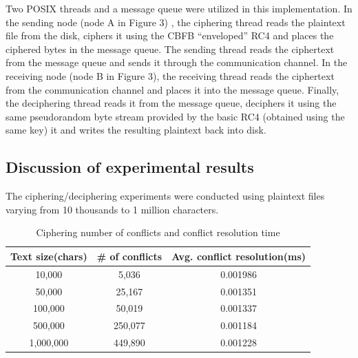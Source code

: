 \documentclass[conference]{IEEEtran}
\begin{document}
Two POSIX threads and a message queue were utilized in this implementation. In the sending node (node A in Figure 3) , the ciphering thread reads the plaintext file from the disk, ciphers it using the CBFB “enveloped” RC4 and places the ciphered bytes in the message queue. The sending thread reads the ciphertext from the message queue and sends it through the communication channel. In the receiving node (node B in Figure 3), the receiving thread reads the ciphertext from the communication channel and places it into the message queue. Finally, the deciphering thread reads it from the message queue, deciphers it using the same pseudorandom byte stream provided by the basic RC4 (obtained using the same key) it and writes the resulting plaintext back into disk.

\subsection{Discussion of experimental results}

The ciphering/deciphering experiments were conducted using plaintext files varying from 10 thousands to 1 million characters. 

\begin{table}[!t]
\centering
\begin{tabular}{|c|c|c|}
\hline
Text size(chars) & \# of conflicts & Avg. conflict resolution(ms) \\ \hline
10,000  & 5,036 & 0.001986                                                               \\ \hline
50,000  & 25,167 & 0.001351                                                                 \\ \hline
100,000 & 50,019 & 0.001337                                                                \\ \hline
500,000 & 250,077 & 0.001184                                                                 \\ \hline
1,000,000 & 449,890 & 0.001228                                                               \\ \hline
\end{tabular}
\caption{Ciphering number of conflicts and conflict resolution time}
\label{conflict-amount}
\end{table}
\end{document}
